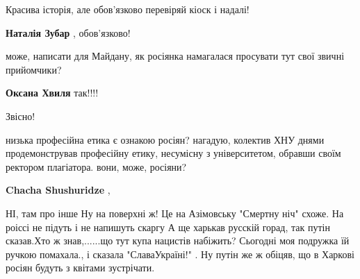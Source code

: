 \begin{itemize}
Красива історія, але обов'язково перевіряй кіоск і надалі!

\begin{itemize}
 
\textbf{Наталія Зубар} , обов'язково!

 
може, написати для Майдану, як росіянка намагалася просувати тут свої звичні прийомчики?

 
\textbf{Оксана Хвиля} так!!!!

 
Звісно!

 
низька професійна етика є ознакою росіян? нагадую, колектив ХНУ днями продемонстрував професійну етику, несумісну з університетом, обравши своїм ректором плагіатора. вони, може, росіяни?

 
\textbf{Chacha Shushuridze} , 

НІ, там про інше Ну на поверхні ж! Це на Азімовську "Смертну ніч" схоже. На
роіссі не підуть і не напишуть скаргу А ще харькав русскій горад, так путін
сказав.Хто ж знав,......що тут купа нацистів набіжить? Сьогодні моя подружка їй
ручкою помахала., і сказала "СлаваУкраїні!" . Ну путін же ж обіцяв, що в
Харкові росіян будуть з квітами зустрічати.




\end{itemize}
\end{itemize}
